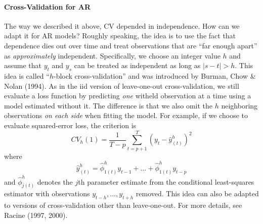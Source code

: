 \documentclass[12pt]{article}
\theoremstyle{definition}
\begin{document}
\paragraph{Cross-Validation for AR}
The way we described it above, CV depended in independence. How can we adapt it for AR models? Roughly speaking, the idea is to use the fact that dependence dies out over time and treat observations that are ``far enough apart'' as \emph{approximately} independent. Specifically, we choose an integer value $h$ and assume that $y_t$ and $y_s$ can be treated as independent as long as $|s - t|>h$. This idea is called ``$h$-block cross-validation'' and was introduced by Burman, Chow \& Nolan (1994). As in the iid version of leave-one-out cross-validation, we still evaluate a loss function by predicting \emph{one} witheld observation at a time using a model estimated without it. The difference is that we also omit the $h$ neighboring observations \emph{on each side} when fitting the model. For example, if we choose to evaluate squared-error loss, the criterion is
	$$CV_h(1) = \frac{1}{T-p}\sum_{t = p+1}^T \left(y_t - \hat{y}_{(t)}^h\right)^2$$
where 
$$\hat{y}^h_{(t)} = \hat{\phi}^h_{1(t)} y_{t-1} + \hdots + \hat{\phi}^h_{1(t)}y_{t-p}$$
and $\hat{\phi}^h_{j(t)}$ denotes the $j$th parameter estimate from the conditional least-squares estimator with observations $y_{t-h}, \hdots,  y_{t+h}$ removed. This idea can also be adapted to versions of cross-validation other than leave-one-out. For more details, see Racine (1997, 2000).
\end{document}

